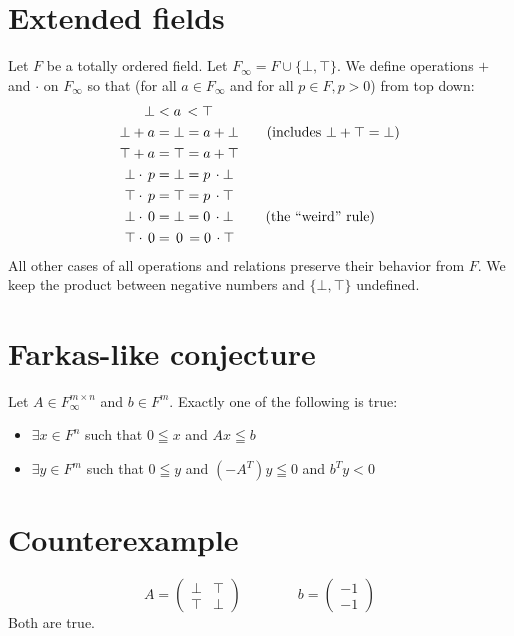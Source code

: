 \documentclass[]{article}
\begin{document}
\section {Extended fields}

Let $F$ be a totally ordered field.
Let $F_\infty = F \cup \{ \bot, \top \}$.
We define operations $+$ and $\cdot$ on $F_\infty$
so that
(for all $a \in F_\infty$ and for all $p \in F, p > 0$)
from top down:
\begin{align*}
	\bot <& \;a\, < \top \\
	\bot + a =& \;\bot = a + \bot \text{\qquad(includes $\bot + \top = \bot$)} \\
	\top + a =& \;\top = a + \top \\
	\bot \cdot\, p =& \;\bot = p \,\cdot \bot \\
	\top \cdot\, p =& \;\top = p \,\cdot \top \\
	\bot \cdot\, 0 =& \;\bot = 0 \,\cdot \bot \text{\qquad\;(the ``weird'' rule)} \\
	\top \cdot\, 0 =& \;\,0\, = 0 \,\cdot \top
\end{align*}
All other cases of all operations and relations
preserve their behavior from $F$.
We keep the product between negative numbers and
$\{ \bot, \top \}$ undefined.

\section{Farkas-like conjecture}

Let $A \in F_\infty^{m \times n}$ and $b \in F^m$.
Exactly one of the following is true:
\begin{itemize}
	\item $\exists x \in F^n$ such that
	$0 \leqq x$ and $A x \leqq b$
	\item $\exists y \in F^m$ such that
	$0 \leqq y$ and $(-A^T) y \leqq 0$ and $b^T y < 0$
\end{itemize}

\section{Counterexample}

$$
A =
\begin{pmatrix}
	\bot & \top\\
	\top & \bot
\end{pmatrix}
\qquad \qquad
b =
\begin{pmatrix}
	-1 \\
	-1
\end{pmatrix}
$$
Both are true.
\end{document}
